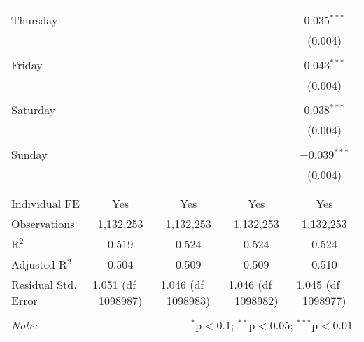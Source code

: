 \documentclass[
]{article}
\begin{document}
\begin{table}[!htbp]
{\begin{tabular}{@{\extracolsep{5pt}}lcccc}
  & & & & \\ 
 Thursday &  &  &  & 0.035$^{***}$ \\ 
  &  &  &  & (0.004) \\ 
  & & & & \\ 
 Friday &  &  &  & 0.043$^{***}$ \\ 
  &  &  &  & (0.004) \\ 
  & & & & \\ 
 Saturday &  &  &  & 0.038$^{***}$ \\ 
  &  &  &  & (0.004) \\ 
  & & & & \\ 
 Sunday &  &  &  & $-$0.039$^{***}$ \\ 
  &  &  &  & (0.004) \\ 
  & & & & \\ 
\hline \\[-1.8ex] 
Individual FE & Yes & Yes & Yes & Yes \\ 
Observations & 1,132,253 & 1,132,253 & 1,132,253 & 1,132,253 \\ 
R$^{2}$ & 0.519 & 0.524 & 0.524 & 0.524 \\ 
Adjusted R$^{2}$ & 0.504 & 0.509 & 0.509 & 0.510 \\ 
Residual Std. Error & 1.051 (df = 1098987) & 1.046 (df = 1098983) & 1.046 (df = 1098982) & 1.045 (df = 1098977) \\ 
\hline 
\hline \\[-1.8ex] 
\textit{Note:}  & \multicolumn{4}{r}{$^{*}$p$<$0.1; $^{**}$p$<$0.05; $^{***}$p$<$0.01} \\ 
\end{tabular}
} 
\end{table} 
\newpage
\end{document}
